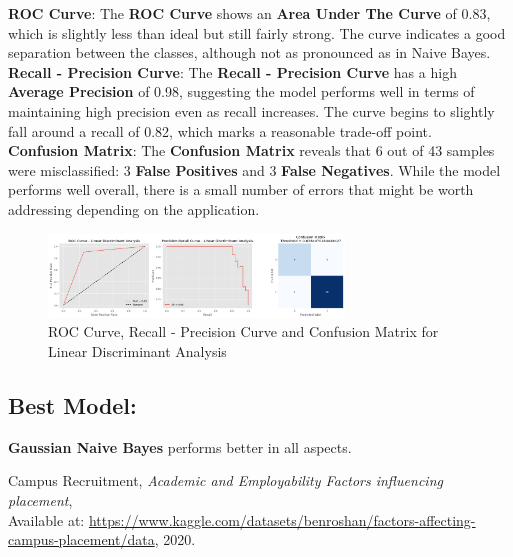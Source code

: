 \documentclass[a4paper,12pt]{article}
\begin{document}
\noindent\textbf{ROC Curve}:
The \textbf{ROC Curve} shows an \textbf{Area Under The Curve} of 0.83, which is slightly less than ideal but still fairly strong. The curve indicates a good separation between the classes, although not as pronounced as in Naive Bayes. \\ 

\noindent\textbf{Recall - Precision Curve}:
The \textbf{Recall - Precision Curve} has a high \textbf{Average Precision} of 0.98, suggesting the model performs well in terms of maintaining high precision even as recall increases. The curve begins to slightly fall around a recall of 0.82, which marks a reasonable trade-off point. \\

\noindent\textbf{Confusion Matrix}:
The \textbf{Confusion Matrix} reveals that 6 out of 43 samples were misclassified: 3 \textbf{False Positives} and 3 \textbf{False Negatives}. While the model performs well overall, there is a small number of errors that might be worth addressing depending on the application. \\ 

\begin{figure}[H]
    \centering
    \includegraphics[width=0.7\textwidth]{./images/roc_rpc_cm_lda.png}
    \caption{ROC Curve, Recall - Precision Curve and Confusion Matrix for Linear Discriminant Analysis}
    \label{fig:fig_5}
\end{figure}


\subsection{Best Model:}
\textbf{Gaussian Naive Bayes} performs better in all aspects. 


\begin{thebibliography}{9}

Campus Recruitment, \textit{Academic and Employability Factors influencing placement}, \\
Available at: \url{https://www.kaggle.com/datasets/benroshan/factors-affecting-campus-placement/data}, 2020.

\end{thebibliography}
\end{document}
